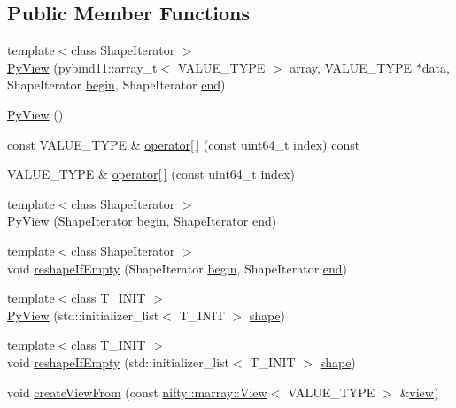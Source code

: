 \subsection*{Public Member Functions}
\begin{DoxyCompactItemize}
\item 
{\footnotesize template$<$class Shape\+Iterator $>$ }\\\hyperlink{classnifty_1_1marray_1_1PyView_a1c3e1533712d9197ebcdbfded78532e8}{Py\+View} (pybind11\+::array\+\_\+t$<$ V\+A\+L\+U\+E\+\_\+\+T\+Y\+P\+E $>$ array, V\+A\+L\+U\+E\+\_\+\+T\+Y\+P\+E $\ast$data, Shape\+Iterator \hyperlink{classandres_1_1View_acd1f71e27ea01d536e1539877afedfa9}{begin}, Shape\+Iterator \hyperlink{classandres_1_1View_af778a1e9839f2f90e503514e36d41b78}{end})
\item 
\hyperlink{classnifty_1_1marray_1_1PyView_afe98775fe6a9b821f3e98f97b352f980}{Py\+View} ()
\item 
const V\+A\+L\+U\+E\+\_\+\+T\+Y\+P\+E \& \hyperlink{classnifty_1_1marray_1_1PyView_ae5eb7b78ed8c6d3478e44a66b04d8aff}{operator\mbox{[}$\,$\mbox{]}} (const uint64\+\_\+t index) const 
\item 
V\+A\+L\+U\+E\+\_\+\+T\+Y\+P\+E \& \hyperlink{classnifty_1_1marray_1_1PyView_a64d9ff12fbe42e31b957b63180fceb82}{operator\mbox{[}$\,$\mbox{]}} (const uint64\+\_\+t index)
\item 
{\footnotesize template$<$class Shape\+Iterator $>$ }\\\hyperlink{classnifty_1_1marray_1_1PyView_aceeb7d7fb74e9dad8a6d930440dfb780}{Py\+View} (Shape\+Iterator \hyperlink{classandres_1_1View_acd1f71e27ea01d536e1539877afedfa9}{begin}, Shape\+Iterator \hyperlink{classandres_1_1View_af778a1e9839f2f90e503514e36d41b78}{end})
\item 
{\footnotesize template$<$class Shape\+Iterator $>$ }\\void \hyperlink{classnifty_1_1marray_1_1PyView_a2141d44a685df3c8f24afafc76c86197}{reshape\+If\+Empty} (Shape\+Iterator \hyperlink{classandres_1_1View_acd1f71e27ea01d536e1539877afedfa9}{begin}, Shape\+Iterator \hyperlink{classandres_1_1View_af778a1e9839f2f90e503514e36d41b78}{end})
\item 
{\footnotesize template$<$class T\+\_\+\+I\+N\+I\+T $>$ }\\\hyperlink{classnifty_1_1marray_1_1PyView_a2a86aa379876d3ed5d81ed3b42bd094f}{Py\+View} (std\+::initializer\+\_\+list$<$ T\+\_\+\+I\+N\+I\+T $>$ \hyperlink{classandres_1_1View_a9bc3d88b3e2bdf432dd68f36ff33deb3}{shape})
\item 
{\footnotesize template$<$class T\+\_\+\+I\+N\+I\+T $>$ }\\void \hyperlink{classnifty_1_1marray_1_1PyView_a88cd936f03f7f4ba07ee7eb4dce4f6eb}{reshape\+If\+Empty} (std\+::initializer\+\_\+list$<$ T\+\_\+\+I\+N\+I\+T $>$ \hyperlink{classandres_1_1View_a9bc3d88b3e2bdf432dd68f36ff33deb3}{shape})
\item 
void \hyperlink{classnifty_1_1marray_1_1PyView_abd0258ab2bf010a8b2fb07143161bf78}{create\+View\+From} (const \hyperlink{classandres_1_1View}{nifty\+::marray\+::\+View}$<$ V\+A\+L\+U\+E\+\_\+\+T\+Y\+P\+E $>$ \&\hyperlink{classandres_1_1View_a190ebba7d686129ac18075e7650e0341}{view})
\end{DoxyCompactItemize}
